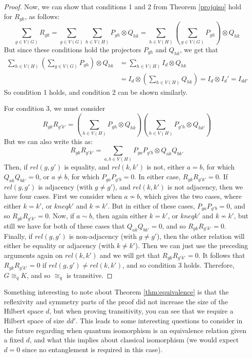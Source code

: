 \documentclass[12pt]{article}
\begin{document}
\begin{proof}
Now, we can show that conditions 1 and 2 from Theorem \ref{projqiso}
hold for $R_{gk}$, as follows:
\begin{equation}
\sum_{g \in V(G)} R_{gk} = \sum_{g \in V(G)} \sum_{h \in V(H)} P_{gh}
\otimes Q_{hk} = \sum_{h \in V(H)} (\sum_{g \in V(G)} P_{gh}) \otimes
Q_{hk}
\end{equation} 
But since these conditions hold the projectors $P_{gh}$ and $Q_{hk}$,
we get that
\begin{align*}
\sum_{h \in V(H)} (\sum_{g \in V(G)} P_{gh}) \otimes Q_{hk} &= \sum_{h
  \in V(H)} I_d \otimes Q_{hk}\\ &= I_d \otimes (\sum_{h \in V(H)}
Q_{hk}) = I_d \otimes I_d' = I_{dd'}
\end{align*}
So condition 1 holds, and condition 2 can be shown similarly.

For condition 3, we must consider
\begin{equation}
R_{gk}R_{g'k'} =(\sum_{h \in V(H)} P_{gh} \otimes Q_{hk})(\sum_{h \in
  V(H)} P_{g'h} \otimes Q_{hk'})
\end{equation}
But we can also write this as:
\begin{equation}
R_{gk}R_{g'k'} = \sum_{a, b \in V(H)} P_{ga}P_{g'b} \otimes
Q_{ak}Q_{bk'}
\end{equation}
Then, if $rel(g, g')$ is equality, and $rel(k, k')$ is not, either
$a=b$, for which $Q_{ak}Q_{bk'} = 0$, or $a \neq b$, for which
$P_{ga}P_{g'b} = 0$. In either case, $R_{gk}R_{g'k'} = 0$.  If $rel(g,
g')$ is adjacency (with $g \neq g'$), and $rel(k, k')$ is not
adjacency, then we have four cases. First we consider when $a \nsim
b$, which gives the two cases, where either $k = k'$, or $k neq k'$
and $k \nsim k'$. But in either of these cases, $P_{ga}P_{g'b} = 0$,
and so $R_{gk}R_{g'k'} = 0$. Now, if $a \sim b$, then again either $k
= k'$, or $k neq k'$ and $k \nsim k'$, but still we have for both of
these cases that $Q_{ak}Q_{bk'} = 0$, and so $R_{gk}R_{g'k'} = 0$.
Finally, if $rel(g, g')$ is non-adjacency (with $g \neq g'$), then the
other relation will either be equality or adjacency (with $k \neq
k'$). Then we can just use the preceding arguments again on $rel(k,
k')$ and we will get that $R_{gk}R_{g'k'} = 0$.  It follows that
$R_{gk}R_{g'k'} = 0$ if $rel(g, g') \neq rel(k, k')$, and so condition
3 holds.  Therefore, $G \cong_q K$, and so $\cong_q$ is transitive.
\end{proof}

Something interesting to note about Theorem \ref{thm:equivalence} is
that the reflexivity and symmetry parts of the proof did not increase
the size of the Hilbert space $d$, but when proving transitivity, you
can see that we require a Hilbert space
of size $dd'$. This leads to some interesting questions to consider in
the future regarding when quantum isomorphism is an equivalence
relation given a fixed $d$, and what this implies about classical
isomorphism (we would expect $d=0$ since no entanglement is required
in this case).
\end{document}

